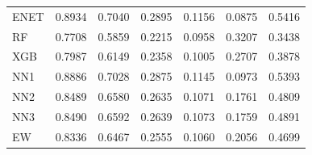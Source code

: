 \begin{table}[p]
\begin{tabular}{lrrrrrr}
ENET & 0.8934 & 0.7040 & 0.2895 & 0.1156 & 0.0875 & 0.5416 \\
RF & 0.7708 & 0.5859 & 0.2215 & 0.0958 & 0.3207 & 0.3438 \\
XGB & 0.7987 & 0.6149 & 0.2358 & 0.1005 & 0.2707 & 0.3878 \\
NN1 & 0.8886 & 0.7028 & 0.2875 & 0.1145 & 0.0973 & 0.5393 \\
NN2 & 0.8489 & 0.6580 & 0.2635 & 0.1071 & 0.1761 & 0.4809 \\
NN3 & 0.8490 & 0.6592 & 0.2639 & 0.1073 & 0.1759 & 0.4891 \\
EW & 0.8336 & 0.6467 & 0.2555 & 0.1060 & 0.2056 & 0.4699 \\
\hline
\end{tabular}
\end{table}
